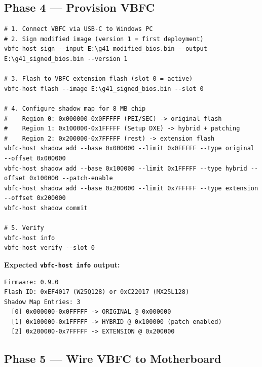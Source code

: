 \subsection*{Phase 4 — Provision VBFC}

\begin{lstlisting}[style=vbfcStyle, caption={Provision VBFC}]
# 1. Connect VBFC via USB-C to Windows PC
# 2. Sign modified image (version 1 = first deployment)
vbfc-host sign --input E:\g41_modified_bios.bin --output E:\g41_signed_bios.bin --version 1

# 3. Flash to VBFC extension flash (slot 0 = active)
vbfc-host flash --image E:\g41_signed_bios.bin --slot 0

# 4. Configure shadow map for 8 MB chip
#    Region 0: 0x000000-0x0FFFFF (PEI/SEC) -> original flash
#    Region 1: 0x100000-0x1FFFFF (Setup DXE) -> hybrid + patching
#    Region 2: 0x200000-0x7FFFFF (rest) -> extension flash
vbfc-host shadow add --base 0x000000 --limit 0x0FFFFF --type original --offset 0x000000
vbfc-host shadow add --base 0x100000 --limit 0x1FFFFF --type hybrid --offset 0x100000 --patch-enable
vbfc-host shadow add --base 0x200000 --limit 0x7FFFFF --type extension --offset 0x200000
vbfc-host shadow commit

# 5. Verify
vbfc-host info
vbfc-host verify --slot 0
\end{lstlisting}

\textbf{Expected \texttt{vbfc-host info} output:}
\begin{lstlisting}[style=vbfcStyle]
Firmware: 0.9.0
Flash ID: 0xEF4017 (W25Q128) or 0xC22017 (MX25L128)
Shadow Map Entries: 3
  [0] 0x000000-0x0FFFFF -> ORIGINAL @ 0x000000
  [1] 0x100000-0x1FFFFF -> HYBRID @ 0x100000 (patch enabled)
  [2] 0x200000-0x7FFFFF -> EXTENSION @ 0x200000
\end{lstlisting}

\subsection*{Phase 5 — Wire VBFC to Motherboard}

